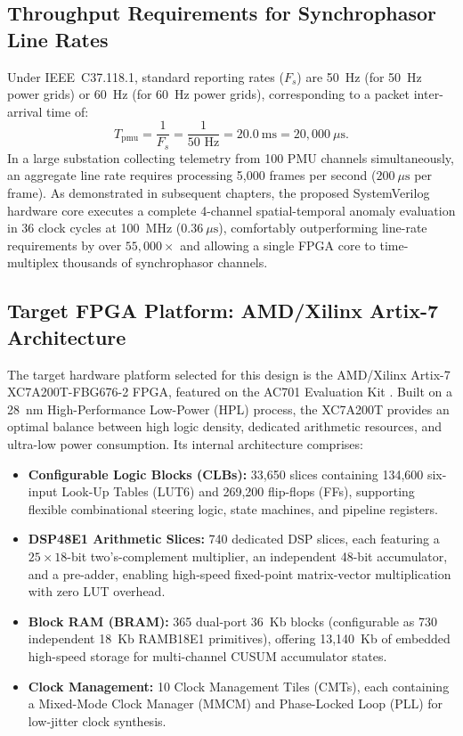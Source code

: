 \documentclass[12pt,a4paper]{report}
\begin{document}
\subsection{Throughput Requirements for Synchrophasor Line Rates}
Under IEEE~C37.118.1, standard reporting rates ($F_s$) are 50~Hz (for 50~Hz power grids) or
60~Hz (for 60~Hz power grids), corresponding to a packet inter-arrival time of:
\begin{equation}
T_{\text{pmu}} = \frac{1}{F_s} = \frac{1}{50\text{ Hz}} = 20.0~\text{ms} = 20,000~\mu\text{s}.
\end{equation}
In a large substation collecting telemetry from 100 PMU channels simultaneously, an aggregate
line rate requires processing 5,000 frames per second ($200~\mu\text{s}$ per frame). As demonstrated
in subsequent chapters, the proposed SystemVerilog hardware core executes a complete 4-channel
spatial-temporal anomaly evaluation in 36 clock cycles at 100~MHz ($0.36~\mu\text{s}$),
comfortably outperforming line-rate requirements by over $55,000\times$ and allowing a single
FPGA core to time-multiplex thousands of synchrophasor channels.

\subsection{Target FPGA Platform: AMD/Xilinx Artix-7 Architecture}
The target hardware platform selected for this design is the AMD/Xilinx Artix-7
XC7A200T-FBG676-2 FPGA, featured on the AC701 Evaluation Kit \cite{artix7ds}. Built on a
28~nm High-Performance Low-Power (HPL) process, the XC7A200T provides an optimal balance
between high logic density, dedicated arithmetic resources, and ultra-low power consumption.
Its internal architecture comprises:
\begin{itemize}
    \item \textbf{Configurable Logic Blocks (CLBs):} 33,650 slices containing 134,600 six-input
    Look-Up Tables (LUT6) and 269,200 flip-flops (FFs), supporting flexible combinational
    steering logic, state machines, and pipeline registers.
    \item \textbf{DSP48E1 Arithmetic Slices:} 740 dedicated DSP slices, each featuring a
    $25 \times 18$-bit two's-complement multiplier, an independent 48-bit accumulator, and
    a pre-adder, enabling high-speed fixed-point matrix-vector multiplication with zero LUT overhead.
    \item \textbf{Block RAM (BRAM):} 365 dual-port 36~Kb blocks (configurable as 730 independent
    18~Kb RAMB18E1 primitives), offering 13,140~Kb of embedded high-speed storage for multi-channel
    CUSUM accumulator states.
    \item \textbf{Clock Management:} 10 Clock Management Tiles (CMTs), each containing a
    Mixed-Mode Clock Manager (MMCM) and Phase-Locked Loop (PLL) for low-jitter clock synthesis.
\end{itemize}
\end{document}
